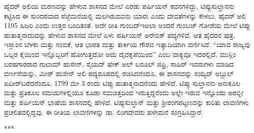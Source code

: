 ಹೈದರ್​ ಅಲಿಯ ಮರಣವನ್ನು ಹೇಳುವ ಶಾಸನದ ಮೇಲೆ ಎರಡು ಪರ್ಷಿಯನ್​ ಕವನಗಳಿದ್ದು, ಟಿಪ್ಪುಸುಲ್ತಾನನು ಕಟ್ಟಿಸಿದ ಈ ಸುಂದರವಾದ ಸೆಜ್ಜೆಮನೆಯಲ್ಲಿ ಮಲಗಿರುವವನು ಯಾರು ಎಂದು ದೇವತೆಗಳನ್ನು ಕೇಳಲು, ಹೈದರ್​ ಅಲಿ 1195 ಹಿಜರಿ ಎಂದು ಉತ್ತರ ಬಂದಿತಂತೆ. ಅದೇ ರೀತಿ ಗುಂಬದ್​\enginline{-}ಇ​\enginline{-}ಅಲಾ ಅಂದರೆ ಗುಂಬಜ್​ ಗೋಡೆಯ ಮೇಲೆ ಟಿಪ್ಪು ಹುತಾತ್ಮನಾದುದನ್ನು ಹೇಳುವ ಶಾಸನದ ಮೇಲೆ ಏಳು ಪರ್ಷಿಯನ್​ ಅರೇಬಿಕ್​ ಪದ್ಯಗಳಿವೆ. ಆತ ಹೈದರನ ಪುತ್ರ, ಇಸ್ಲಾಂನ ಬೆಳಕು ಮತ್ತು ನಂಬಿಕೆ, ಆತ ಭಾರತ ಮತ್ತು ತುರ್ಕಿಯ ಗೌರವ ಇತ್ಯಾದಿಯಾಗಿ ವರ್ಣಿಸಿದೆ. “ಯಾವ ರಾಜ್ಯವು ಒಬ್ಬರ ಕೈಯಿಂದ ಇನ್ನೊಬ್ಬರಿಗೆ ಹೋಗುತ್ತದೋ ಅದು ದೈವಕೃಪೆಯಿಂದ” ಎಂಬ ವಾಕ್ಯವೂ ಇದರಲ್ಲಿದೆ. ಮುಸ್ಲಿಂ ಬರಹಗಾರರಾದ ಗುಲಾಮ್ ಹುಸೇನ್​, ಸೈಯದ್​ ಷೇಕ್​ ಅಲ್​ ಬರೂಲ್​ ಜಿಫ್ರಿ, ಸಾಹಿರ್​ ಇವರುಗಳು ಮಾಡಿದ ವರ್ಣನೆಯನ್ನು, ಮೀರ್​ ಹುಸೇನ್​ ಅಲಿ ಪದ್ಯರೂಪದಲ್ಲಿ ರಚಿಸಿದನೆಂದೂ, ಈ ಶಾಸನವನ್ನು ಸಯ್ಯದ್​ ಅಬ್ದುಲ್​ ಖದೀರ್​ ಬರೆದನೆಂದೂ, 1799 ಮೇ 3 ರಂದು ಟಿಪ್ಪು ಹುತಾತ್ಮನಾದನೆಂದು ಹೇಳಿದೆ. ಟಿಪ್ಪು ಸುಲ್ತಾನನು ಅನುಕೂಲ ಮತ್ತು ಪ್ರತಿಕೂಲ ಸಮಯಗಳಲ್ಲಿಯೂ ಕೂಡಾ ಸಮಚಿತ್ತದಿಂದ ಇರುತ್ತಿದ್ದನೆಂದು ಅಲ್ಲೇ ಇರುವ ಇನ್ನೊಂದು ಅರಬ್ಬೀ ಮತ್ತು ಪರ್ಷಿಯನ್​ ಭಾಷೆಯ ಶಾಸನದಲ್ಲಿ ಹೇಳಿದೆ. ಟಿಪ್ಪುಸುಲ್ತಾನ್​ ಮತ್ತು ಶ‍್ರೀರಂಗಪಟ್ಟಣವನ್ನು ಕುರಿತು ಲಾವಣಿಗಳು ಪ್ರಚಲಿತದಲ್ಲಿದ್ದವು. ಈ ರೀತಿಯ ಲಾವಣಿಗಳನ್ನು ಡಾ. ಲಿಂಗದೇವರು ಹಳೇಮನೆ ಸಂಗ್ರಹಿಸಿದ್ದಾರೆ.

\begin{center}
***
\end{center}

\theendnotes

